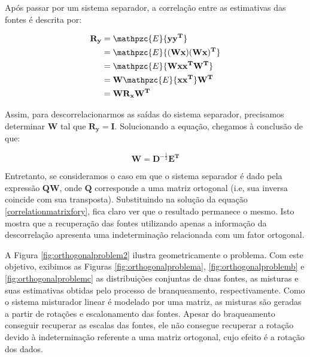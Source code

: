     Após passar por um sistema separador, a correlação entre as estimativas das fontes é descrita por:
    
        \begin{equation}
        \label{eq:correlationmatrixfory}
        \begin{split}
        \mathbf{R_y} & = \mathpzc{E}\{\mathbf{yy^T}\}\\
                     & = \mathpzc{E}\{\mathbf{(Wx)(Wx)^T}\}\\
                     & = \mathpzc{E}\{\mathbf{Wxx^TW^T}\} \\
                     & = \mathbf{W}\mathpzc{E}\{\mathbf{xx^T}\}\mathbf{W^T} \\
                     & = \mathbf{W}\mathbf{R_x}\mathbf{W^T} \\
        \end{split}
    \end{equation}
    
    Assim, para descorrelacionarmos as saídas do sistema separador, precisamos determinar $\mathbf{W}$ tal que $\mathbf{R_y = I}$. Solucionando a equação, chegamos à conclusão de que:
    
    \begin{equation}
        \label{separationmatrixsolution}
        \mathbf{W} = \mathbf{D}^{-\frac{1}{2}}\mathbf{E^T}
    \end{equation}
    
    Entretanto, se consideramos o caso em que o sistema separador é dado pela expressão $\mathbf{QW}$, onde $\mathbf{Q}$ corresponde a uma matriz ortogonal (i.e, sua inversa coincide com sua transposta). Substituindo na solução da equação \ref{correlationmatrixfory}, fica claro ver que o resultado permanece o mesmo. Isto mostra que a recuperação das fontes utilizando apenas a informação da descorrelação apresenta uma indeterminação relacionada com um fator ortogonal.
    
    A Figura \ref{fig:orthogonalproblem2} ilustra geometricamente o problema. Com este objetivo, exibimos as Figuras \ref{fig:orthogonalproblema}, \ref{fig:orthogonalproblemb} e \ref{fig:orthogonalproblemc} as distribuições conjuntas de duas fontes, as misturas e suas estimativas obtidas pelo processo de branqueamento, respectivamente. Como o sistema misturador linear é modelado por uma matriz, as misturas são geradas a partir de rotações e escalonamento das fontes. Apesar do braqueamento conseguir recuperar as escalas das fontes, ele não consegue recuperar a rotação devido à indeterminação referente a uma matriz ortogonal, cujo efeito é a rotação dos dados.
    
